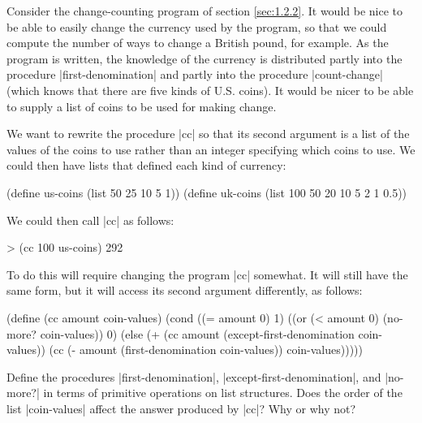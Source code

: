 \begin{Exercise}
\label{exc:2.19}
Consider the change-counting program of section \ref{sec:1.2.2}.  It
would be nice to be able to easily change the currency used by the
program, so that we could compute the number of ways to change a
British pound, for example.  As the program is written, the knowledge
of the currency is distributed partly into the procedure
\scheme|first-denomination| and partly into the procedure
\scheme|count-change| (which knows that there are five kinds of
U.S. coins).  It would be nicer to be able to supply a list of coins
to be used for making change.

We want to rewrite the procedure \scheme|cc| so that its second
argument is a list of the values of the coins to use rather than an
integer specifying which coins to use.  We could then have lists that
defined each kind of currency:

\begin{schemedisplay}
(define us-coins (list 50 25 10 5 1))
(define uk-coins (list 100 50 20 10 5 2 1 0.5))
\end{schemedisplay}
We could then call \scheme|cc| as follows:

\begin{schemedisplay}
> (cc 100 us-coins)
292
\end{schemedisplay}
To do this will require changing the program \scheme|cc| somewhat.  It
will still have the same form, but it will access its second argument
differently, as follows:

\begin{schemedisplay}
(define (cc amount coin-values)
  (cond ((= amount 0) 1)
        ((or (< amount 0) (no-more? coin-values)) 0)
        (else
         (+ (cc amount
                (except-first-denomination coin-values))
            (cc (- amount
                   (first-denomination coin-values))
                coin-values)))))
\end{schemedisplay}
Define the procedures \scheme|first-denomination|,
\scheme|except-first-denomination|, and \scheme|no-more?| in terms of
primitive operations on list structures.  Does the order of the list
\scheme|coin-values| affect the answer produced by \scheme|cc|?  Why
or why not?
\end{Exercise}

